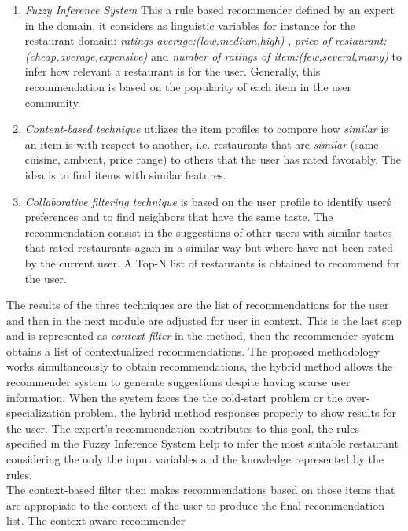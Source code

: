 \begin{enumerate}  
\item \textit{Fuzzy Inference System} This a rule based recommender defined by an expert
in the domain, it considers as linguistic variables for instance for
the restaurant domain: \textit{ratings average:(low,medium,high)} ,
\textit{price of restaurant:(cheap,average,expensive)} and 
\textit{number of ratings of item:(few,several,many)} to infer how
relevant a restaurant is for the user. Generally, this recommendation
is based on the popularity of each item in the user community.
\item \textit{Content-based technique} utilizes the item profiles 
to compare how \textit{similar} is an item is with respect to another, i.e.  
restaurants that are \textit{similar} (same cuisine, ambient, price range)  to others 
that the user has rated favorably. The idea is to find items 
with similar features. 
\item \textit{Collaborative filtering
technique} is based on the user profile to identify user\'s
preferences and to find neighbors that have the same taste. The
recommendation consist in the suggestions of other users with similar
tastes that rated restaurants again in a similar way but
where have not been rated by the current user.
A Top-N list of restaurants is obtained to recommend for the user. 
\end{enumerate} 
The results of the three techniques are the list of
recommendations for the user and then in the next module are adjusted 
for user in context.
This is the last step and is represented as \textit{context filter} in
the method, then the recommender system obtains a list of
contextualized recommendations. The proposed methodology works
simultaneously to obtain recommendations, the hybrid method allows the
recommender system to generate suggestions despite having scarse
user information. When the system faces the the cold-start
problem or the over-specialization problem, the hybrid method
responses properly to show results for the user. 
The expert's 
recommendation contributes to this goal, the rules specified in 
the Fuzzy Inference System help to infer the most suitable 
restaurant considering the only the input variables and the knowledge 
represented by the rules.\\
The context-based filter then makes recommendations based on those
items that are appropiate to the context of the user to produce
the final recommendation list. The context-aware recommender
